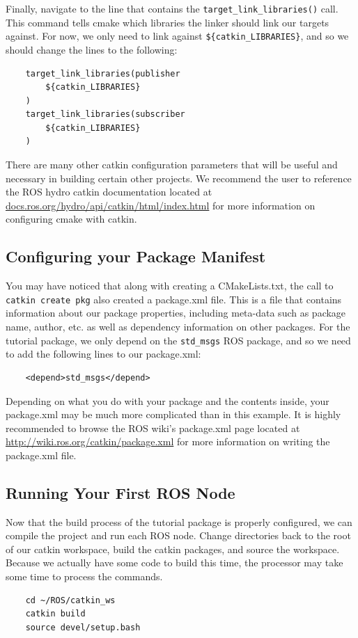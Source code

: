 \documentclass[11pt, twoside, pdftex]{article}
\begin{document}
Finally, navigate to the line that contains the \lstinline|target_link_libraries()| call. This command tells cmake which libraries the linker should link our targets against. For now, we only need to link against \lstinline|${catkin_LIBRARIES}|, and so we should change the lines to the following:
\begin{lstlisting}
	target_link_libraries(publisher
		${catkin_LIBRARIES}
	)
	target_link_libraries(subscriber
		${catkin_LIBRARIES}
	)
\end{lstlisting}
There are many other catkin configuration parameters that will be useful and necessary in building certain other projects. We recommend the user to reference the ROS hydro catkin documentation located at \url{docs.ros.org/hydro/api/catkin/html/index.html} for more information on configuring cmake with catkin.

\subsection{Configuring your Package Manifest}
You may have noticed that along with creating a CMakeLists.txt, the call to \lstinline|catkin create pkg| also created a package.xml file. This is a file that contains information about our package properties, including meta-data such as package name, author, etc. as well as dependency information on other packages. For the tutorial package, we only depend on the \lstinline|std_msgs| ROS package, and so we need to add the following lines to our package.xml:
\begin{lstlisting}
	<depend>std_msgs</depend>
\end{lstlisting}
Depending on what you do with your package and the contents inside, your package.xml may be much more complicated than in this example. It is highly recommended to browse the ROS wiki's package.xml page located at \url{http://wiki.ros.org/catkin/package.xml} for more information on writing the package.xml file.

\subsection{Running Your First ROS Node}\label{sec:rosrun}
Now that the build process of the tutorial package is properly configured, we can compile the project and run each ROS node. Change directories back to the root of our catkin workspace, build the catkin packages, and source the workspace. Because we actually have some code to build this time, the processor may take some time to process the commands.
\begin{lstlisting}
	cd ~/ROS/catkin_ws
	catkin build
	source devel/setup.bash
\end{lstlisting}
\end{document}
